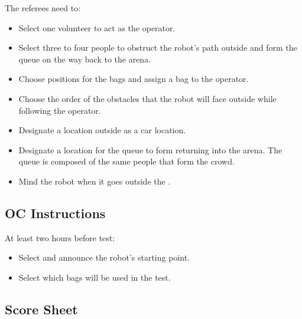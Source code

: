 The referees need to:
\begin{itemize}[nosep]
	\item Select one volunteer to act as the operator.
	\item Select three to four people to obstruct the robot's path outside and form the queue on the way back to the arena.
	\item Choose positions for the bags and assign a bag to the operator.
	\item Choose the order of the obstacles that the robot will face outside while following the operator.
	\item Designate a location outside as a car location.
	\item Designate a location for the queue to form returning into the arena. The queue is composed of the same people that form the crowd.
	\item Mind the robot when it goes outside the \Arena{}.
\end{itemize}

\subsection*{OC Instructions}

At least two hours before test:
\begin{itemize}[nosep]
	\item Select and announce the robot's starting point.
	\item Select which bags will be used in the test.
\end{itemize}

\subsection*{Score Sheet}

